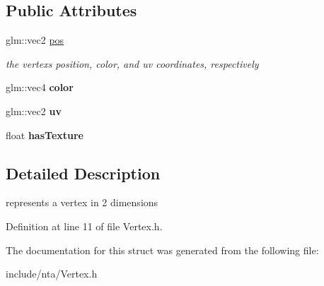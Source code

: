 \subsection*{Public Attributes}
\begin{DoxyCompactItemize}
\item 
\mbox{\label{structnta_1_1Vertex2D_a27a44e1ca52b5a5a13d37495e9376636}} 
glm\+::vec2 \hyperlink{structnta_1_1Vertex2D_a27a44e1ca52b5a5a13d37495e9376636}{pos}
\begin{DoxyCompactList}\small\item\em the vertex\textquotesingle{}s position, color, and uv coordinates, respectively \end{DoxyCompactList}\item 
\mbox{\label{structnta_1_1Vertex2D_a05016aff7572c60a2cb688e67b2a4a31}} 
glm\+::vec4 {\bfseries color}
\item 
\mbox{\label{structnta_1_1Vertex2D_a71707b6c29cae0e883e76042e27e84d5}} 
glm\+::vec2 {\bfseries uv}
\item 
\mbox{\label{structnta_1_1Vertex2D_ac1b1fb722a89abaee9cddfb59543af85}} 
float {\bfseries has\+Texture}
\end{DoxyCompactItemize}


\subsection{Detailed Description}
represents a vertex in 2 dimensions 

Definition at line 11 of file Vertex.\+h.



The documentation for this struct was generated from the following file\+:\begin{DoxyCompactItemize}
\item 
include/nta/Vertex.\+h\end{DoxyCompactItemize}
